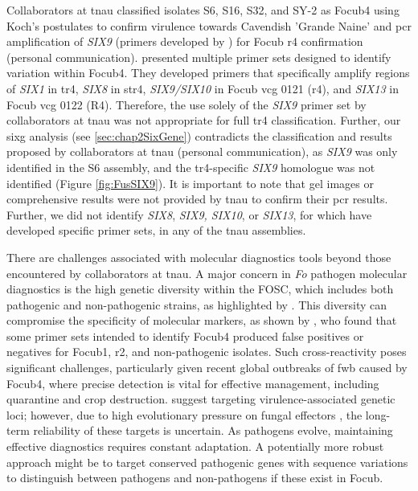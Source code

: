 Collaborators at \ac{tnau} classified isolates S6, S16, S32, and SY-2 as \ac{Focub4} using Koch's postulates to confirm virulence towards Cavendish  'Grande Naine' and \ac{pcr} amplification of \textit{SIX9} (primers developed by \textcite{Carvalhais2019}) for \ac{Focub} \ac{r4} confirmation (personal communication). \textcite{Carvalhais2019} presented multiple primer sets designed to identify variation within \ac{Focub4}. They developed primers that specifically amplify regions of \textit{SIX1} in \ac{tr4}, \textit{SIX8} in \ac{str4}, \textit{SIX9/SIX10} in \ac{Focub} \ac{vcg} 0121 (\ac{r4}), and \textit{SIX13} in \ac{Focub} \ac{vcg} 0122 (R4). Therefore, the use solely of the \textit{SIX9} primer set by collaborators at \ac{tnau} was not appropriate for full \ac{tr4} classification. Further, our \ac{sixg} analysis (see \ref{sec:chap2SixGene}) contradicts the classification and results proposed by collaborators at \ac{tnau} (personal communication), as \textit{SIX9} was only identified in the S6 assembly, and the \ac{tr4}-specific \textit{SIX9} homologue was not identified (Figure \ref{fig:FusSIX9}). It is important to note that gel images or comprehensive results were not provided by \ac{tnau} to confirm their \ac{pcr} results. Further, we did not identify \textit{SIX8}, \textit{SIX9, SIX10}, or \textit{SIX13}, for which  \textcite{Carvalhais2019} have developed specific primer sets, in any of the \ac{tnau} assemblies. 

There are challenges associated with molecular diagnostics tools beyond those encountered by collaborators at \ac{tnau}. A major concern in \textit{Fo} pathogen molecular diagnostics is the high genetic diversity within the \ac{FOSC}, which includes both pathogenic and non-pathogenic strains, as highlighted by \textcite{demers2015highly}. This diversity can compromise the specificity of molecular markers, as shown by \textcite{Magdama2019}, who found that some primer sets intended to identify \ac{Focub4} produced false positives or negatives for \ac{Focub1}, \ac{r2}, and non-pathogenic isolates. Such cross-reactivity poses significant challenges, particularly given recent global outbreaks of \ac{fwb} caused by \ac{Focub4}, where precise detection is vital for effective management, including quarantine and crop destruction. \textcite{Magdama2019} suggest targeting virulence-associated genetic loci; however, due to high evolutionary pressure on fungal effectors \parencite{Todd2022}, the long-term reliability of these targets is uncertain. As pathogens evolve, maintaining effective diagnostics requires constant adaptation. A potentially more robust approach might be to target conserved pathogenic genes with sequence variations to distinguish between pathogens and non-pathogens if these exist in \ac{Focub}. 

